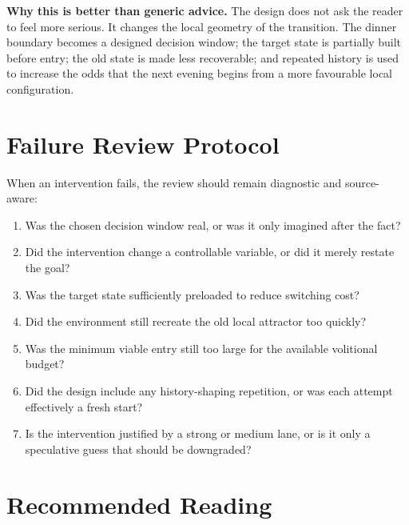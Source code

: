 \begin{example}
\textbf{Why this is better than generic advice.}
The design does not ask the reader to feel more serious. It changes the local
geometry of the transition. The dinner boundary becomes a designed decision
window; the target state is partially built before entry; the old state is made
less recoverable; and repeated history is used to increase the odds that the
next evening begins from a more favourable local configuration.
\end{example}

\section{Failure Review Protocol}

When an intervention fails, the review should remain diagnostic and source-aware:
\begin{enumerate}[nosep]
  \item Was the chosen decision window real, or was it only imagined after the
        fact?
  \item Did the intervention change a controllable variable, or did it merely
        restate the goal?
  \item Was the target state sufficiently preloaded to reduce switching cost?
  \item Did the environment still recreate the old local attractor too quickly?
  \item Was the minimum viable entry still too large for the available
        volitional budget?
  \item Did the design include any history-shaping repetition, or was each
        attempt effectively a fresh start?
  \item Is the intervention justified by a strong or medium lane, or is it only
        a speculative guess that should be downgraded?
\end{enumerate}

\section{Recommended Reading}

